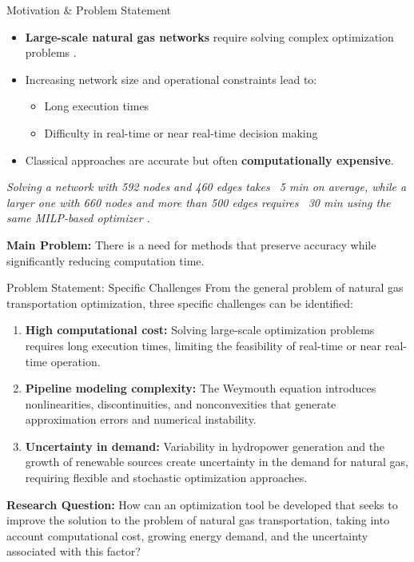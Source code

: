 \documentclass[hyperref={colorlinks,citecolor=blue,linkcolor=blue,urlcolor=blue}]{beamer}
\begin{document}
\begin{frame}{Motivation \& Problem Statement}
\justifying
\footnotesize 

\begin{itemize}
    \footnotesize 
    \item \textbf{Large-scale natural gas networks} require solving complex optimization problems \cite{9831787}.
    \item Increasing network size and operational constraints lead to:
    \begin{itemize}
        \footnotesize 
        \item Long execution times
        \item Difficulty in real-time or near real-time decision making
    \end{itemize}
    \item Classical approaches are accurate but often \textbf{computationally expensive}.
\end{itemize}

\textit{Solving a network with 592 nodes and 460 edges takes ~5 min on average, while a larger one with 660 nodes and more than 500 edges requires ~30 min using the same MILP-based optimizer \cite{artice_time_comparison}}.

\vspace{0.5cm}
\textbf{Main Problem:} There is a need for methods that preserve accuracy while significantly reducing computation time.
\end{frame}



\begin{frame}{Problem Statement: Specific Challenges}
\justifying
\footnotesize
From the general problem of natural gas transportation optimization, three specific challenges can be identified:
\begin{enumerate}
    \footnotesize
    \item \textbf{High computational cost:}  
    Solving large-scale optimization problems requires long execution times, limiting the feasibility of real-time or near real-time operation.

    \item \textbf{Pipeline modeling complexity:}  
    The Weymouth equation introduces nonlinearities, discontinuities, and nonconvexities that generate approximation errors and numerical instability.

    \item \textbf{Uncertainty in demand:}  
    Variability in hydropower generation and the growth of renewable sources create uncertainty in the demand for natural gas, requiring flexible and stochastic optimization approaches.
\end{enumerate}

\vspace{0.5cm}
\textbf{Research Question:} How can an optimization tool be developed that seeks to improve the solution to the problem of natural gas transportation, taking into account computational cost, growing energy demand, and the uncertainty associated with this factor?
\end{frame}
\end{document}
